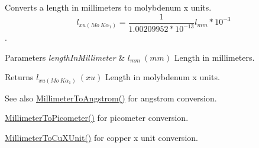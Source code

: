 Converts a length in millimeters to molybdenum x units. \[ l_{xu(Mo\ K\alpha_1)}=\frac{1}{1.00209952*10^{-13}} l_{mm} * 10^{-3}\]. 


\begin{DoxyParams}{Parameters}
{\em length\+In\+Millimeter} & $ l_{mm}\ (mm)$ Length in millimeters. \\
\hline
\end{DoxyParams}
\begin{DoxyReturn}{Returns}
$ l_{xu(Mo\ K\alpha_1)}\ (xu)$ Length in molybdenum x units. 
\end{DoxyReturn}
\begin{DoxySeeAlso}{See also}
\mbox{\hyperlink{group___e_g_x_math-_conversions-_length_conversions-_millimeter-_non-_s_i_ga40e4659f4689e5be54f8e28fd8ce0008}{Millimeter\+To\+Angstrom()}} for angstrom conversion. 

\mbox{\hyperlink{group___e_g_x_math-_conversions-_length_conversions-_millimeter-_s_i_ga679e3714c229f1355a5c9bf707fcd723}{Millimeter\+To\+Picometer()}} for picometer conversion. 

\mbox{\hyperlink{group___e_g_x_math-_conversions-_length_conversions-_millimeter-_non-_s_i_gaa9a94e1f42047955530f673047c4370b}{Millimeter\+To\+Cu\+X\+Unit()}} for copper x unit conversion. 
\end{DoxySeeAlso}
